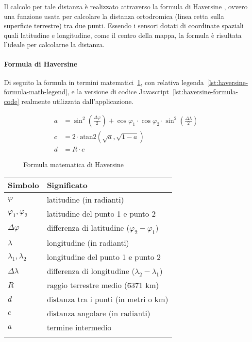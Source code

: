 Il calcolo per tale distanza è realizzato attraverso la formula di Haversine \cite{haversine_formula},
ovvero una funzione usata per calcolare la distanza ortodromica (linea retta sulla superficie terrestre) tra due punti.
Essendo i sensori dotati di coordinate spaziali quali latitudine e longitudine, come il centro della mappa,
la formula è risultata l'ideale per calcolarne la distanza.

\paragraph{Formula di Haversine}

Di seguito la formula in termini matematici~\ref{lst:haversine-formula-math},
con relativa legenda~\ref{lst:haversine-formula-math-legend}, e la versione
di codice Javascript~\ref{lst:haversine-formula-code} realmente utilizzata dall'applicazione.

\begin{figure}[h]
  \begin{align}
    a & = \sin^2\left(\frac{\Delta\varphi}{2}\right) + \cos\varphi_1 \cdot \cos\varphi_2 \cdot \sin^2\left(\frac{\Delta\lambda}{2}\right) \\
    c & = 2 \cdot \text{atan2}\left(\sqrt{a}, \sqrt{1-a}\right)                                                                           \\
    d & = R \cdot c
  \end{align}
  \caption{Formula matematica di Haversine}
  \label{lst:haversine-formula-math}
\end{figure}

\begin{tabular}{ll}
  \textbf{Simbolo}       & \textbf{Significato}                                \\
  \hline
  $\varphi$              & latitudine (in radianti)                            \\
  $\varphi_1, \varphi_2$ & latitudine del punto 1 e punto 2                    \\
  $\Delta\varphi$        & differenza di latitudine ($\varphi_2 - \varphi_1$)  \\
  $\lambda$              & longitudine (in radianti)                           \\
  $\lambda_1, \lambda_2$ & longitudine del punto 1 e punto 2                   \\
  $\Delta\lambda$        & differenza di longitudine ($\lambda_2 - \lambda_1$) \\
  $R$                    & raggio terrestre medio (\~ 6371 km)                 \\
  $d$                    & distanza tra i punti (in metri o km)                \\
  $c$                    & distanza angolare (in radianti)                     \\
  $a$                    & termine intermedio                                  \\
  \label{lst:haversine-formula-math-legend}
\end{tabular}

